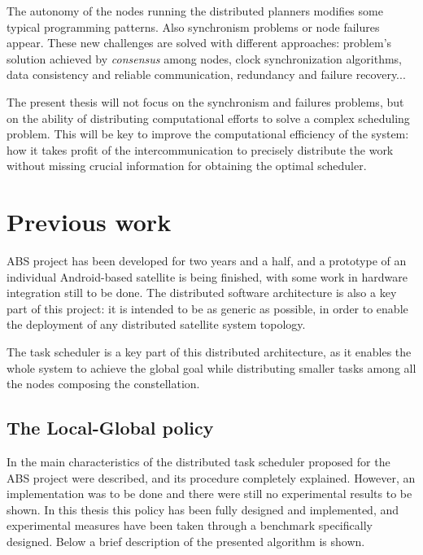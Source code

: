 The autonomy of the nodes running the distributed planners modifies some typical programming patterns. Also synchronism problems or node failures appear. These new challenges are solved with different approaches: problem's solution achieved by \emph{consensus} among nodes, clock synchronization algorithms, data consistency and reliable communication, redundancy and failure recovery... \citep{Tanenbaum:2006:DSP:1202502}

The present thesis will not focus on the synchronism and failures problems, but on the ability of distributing computational efforts to solve a complex scheduling problem. This will be key to improve the computational efficiency of the system: how it takes profit of the intercommunication to precisely distribute the work without missing crucial information for obtaining the optimal scheduler.

\section{Previous work}
\label{sec_previouswork}
ABS project has been developed for two years and a half, and a prototype of an individual Android-based satellite is being finished, with some work in hardware integration still to be done. The distributed software architecture is also a key part of this project: it is intended to be as generic as possible, in order to enable the deployment of any distributed satellite system topology.

The task scheduler is a key part of this distributed architecture, as it enables the whole system to achieve the global goal while distributing smaller tasks among all the nodes composing the constellation.

\subsection{The Local-Global policy}

In \citep{Araguz15} the main characteristics of the distributed task scheduler proposed for the ABS project were described, and its procedure completely explained. However, an implementation was to be done and there were still no experimental results to be shown. In this thesis this policy has been fully designed and implemented, and experimental measures have been taken through a benchmark specifically designed. Below a brief description of the presented algorithm is shown.

